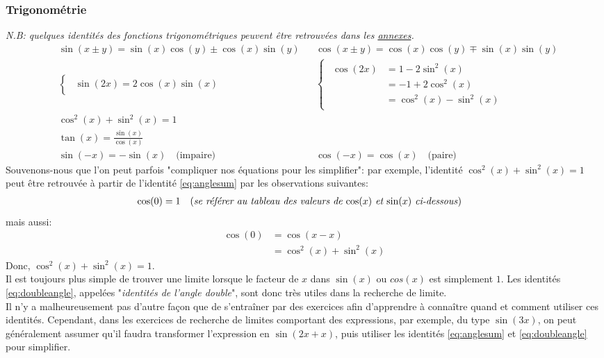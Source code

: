 \documentclass{article}
\begin{document}
\subsubsection{Trigonométrie}
\emph{N.B: quelques identités des fonctions trigonométriques peuvent être retrouvées dans les \hyperref[sec:hypertrigo]{annexes}.}
\begin{align}
	\label{eq:anglesum}
	&\sin(x \pm y) 	= \sin(x) \cos(y) \pm \cos(x) \sin(y)	& &\cos(x \pm y) 	= \cos(x) \cos(y) \mp \sin(x)\sin(y) \\
	\label{eq:doubleangle}
	&\begin{cases}
		\begin{aligned}	
			\sin(2x) = 2\cos(x)\sin(x)
		\end{aligned} 
	\end{cases} & &\begin{cases}
		\begin{aligned}
			\cos(2x) 	&= 1 - 2\sin^2(x) \\
						&= -1 + 2\cos^2(x)  \\
						&= \cos^2(x) - \sin^2(x)
		\end{aligned}
	\end{cases} \\
	&\cos^2(x) + \sin^2(x) = 1 \\
	&\tan(x) = \frac{\sin(x)}{\cos(x)} \\
	&\sin(-x) = -\sin(x) \quad \text{(impaire)}		& &\cos(-x) = \cos(x) \quad \text{(paire)}
\end{align}
Souvenons-nous que l'on peut parfois "compliquer nos équations pour les simplifier": par exemple, l'identité \(\cos^2(x) + \sin^2(x) = 1\) peut être retrouvée à partir de l'identité \ref{eq:anglesum} par les observations suivantes: 
\vspace{-0.2cm}
\begin{align*}
	\cos(0) 	&= 1 \quad \text{(\emph{se référer au tableau des valeurs de \(\cos(x)\) et \(\sin(x)\) ci-dessous})}
\end{align*}
\vspace{-0.2cm}
mais aussi: 
\begin{align*}
	\cos(0)	&= \cos(x-x) \\
				&= \cos^2(x) + \sin^2(x) 
\end{align*}
Donc, \(\cos^2(x) + \sin^2(x) = 1\). \\
Il est toujours plus simple de trouver une limite lorsque le facteur de \(x\) dans \(\sin(x)\) ou \(cos(x)\) est simplement \(1\). Les identités \ref{eq:doubleangle}, appelées "\emph{identités de l'angle double}", sont donc très utiles dans la recherche de limite. \\
Il n'y a malheureusement pas d'autre façon que de s'entraîner par des exercices afin d'apprendre à connaître quand et comment utiliser ces identités. Cependant, dans les exercices de recherche de limites comportant des expressions, par exemple, du type \(\sin(3x)\), on peut généralement assumer qu'il faudra transformer l'expression en \(\sin(2x + x)\), puis utiliser les identités \ref{eq:anglesum} et \ref{eq:doubleangle} pour simplifier.
\end{document}
